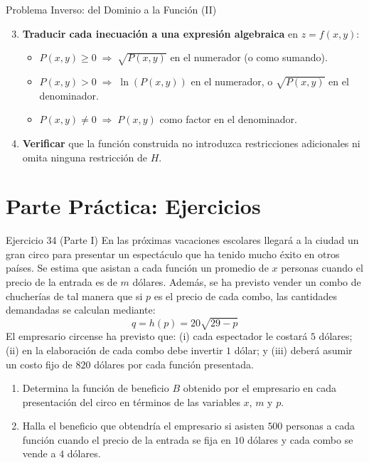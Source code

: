 \documentclass[aspectratio=169,10pt]{beamer}
\begin{document}
\begin{frame}{Problema Inverso: del Dominio a la Función (II)}
  \begin{enumerate}
    \setcounter{enumi}{2}
    \item \textbf{Traducir cada inecuación a una expresión algebraica} en $z = f(x,y)$:
      \begin{itemize}
        \item $P(x,y) \ge 0 \;\Longrightarrow\; \sqrt{P(x,y)}$ en el numerador (o como sumando).
        \item $P(x,y) > 0 \;\Longrightarrow\; \ln(P(x,y))$ en el numerador, o $\sqrt{P(x,y)}$ en el denominador.
        \item $P(x,y) \neq 0 \;\Longrightarrow\; P(x,y)$ como factor en el denominador.
      \end{itemize}
    \item \textbf{Verificar} que la función construida no introduzca restricciones adicionales
      ni omita ninguna restricción de $H$.
  \end{enumerate}
  \vfill
\end{frame}

\section{Parte Práctica: Ejercicios}

\begin{frame}{Ejercicio 34 (Parte I)}
  \small
  En las próximas vacaciones escolares llegará a la ciudad un gran circo para presentar un espectáculo que ha tenido mucho éxito en otros países. Se estima que asistan a cada función un promedio de $x$ personas cuando el precio de la entrada es de $m$ dólares. Además, se ha previsto vender un combo de chucherías de tal manera que si $p$ es el precio de cada combo, las cantidades demandadas se calculan mediante:
  \[
    q = h(p) = 20\sqrt{29 - p}
  \]
  El empresario circense ha previsto que: (i) cada espectador le costará $5$ dólares; (ii) en la elaboración de cada combo debe invertir $1$ dólar; y (iii) deberá asumir un costo fijo de $820$ dólares por cada función presentada.

  \medskip
  \begin{enumerate}
    \item[(A)] Determina la función de beneficio $B$ obtenido por el empresario en cada presentación del circo en términos de las variables $x$, $m$ y $p$.
    \item[(B)] Halla el beneficio que obtendría el empresario si asisten $500$ personas a cada función cuando el precio de la entrada se fija en $10$ dólares y cada combo se vende a $4$ dólares.
  \end{enumerate}
  \vfill
\end{frame}
\end{document}
